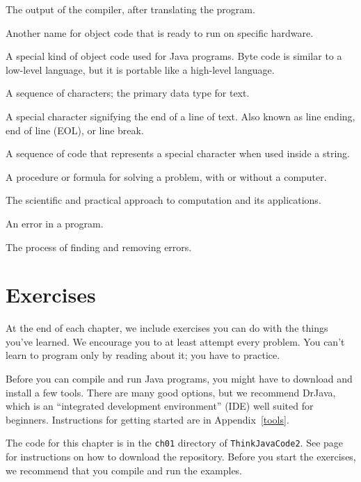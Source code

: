\begin{description}
The output of the compiler, after translating the program.

Another name for object code that is ready to run on specific hardware.

A special kind of object code used for Java programs.
Byte code is similar to a low-level language, but it is portable like a high-level language.

A sequence of characters; the primary data type for text.

A special character signifying the end of a line of text.
Also known as line ending, end of line (EOL), or line break.


A sequence of code that represents a special character when used inside a string.

A procedure or formula for solving a problem, with or without a computer.

The scientific and practical approach to computation and its applications.

An error in a program.

The process of finding and removing errors.

\end{description}


\section{Exercises}

At the end of each chapter, we include exercises you can do with the things you've learned.
We encourage you to at least attempt every problem.
You can't learn to program only by reading about it; you have to practice.

Before you can compile and run Java programs, you might have to download and install a few tools.
There are many good options, but we recommend DrJava, which is an ``integrated development environment'' (IDE) well suited for beginners.
Instructions for getting started are in Appendix~\ref{tools}.

The code for this chapter is in the {\tt ch01} directory of {\tt ThinkJavaCode2}.
See page~\pageref{code} for instructions on how to download the repository.
Before you start the exercises, we recommend that you compile and run the examples.


